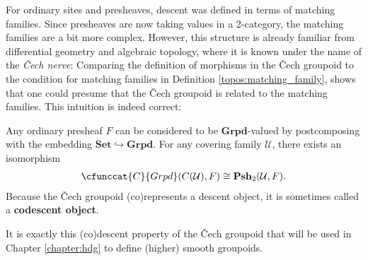     For ordinary sites and presheaves, descent was defined in terms of matching families. Since presheaves are now taking values in a 2-category, the matching families are a bit more complex. However, this structure is already familiar from differential geometry and algebraic topology, where it is known under the name of the \textit{\v{C}ech nerve}:
    Comparing the definition of morphisms in the \v{C}ech groupoid to the condition for matching families in Definition \ref{topos:matching_family}, shows that one could presume that the \v{C}ech groupoid is related to the matching families. This intuition is indeed correct:
    \begin{property}\label{topos:cech_matching_families}
        Any ordinary presheaf $F$ can be considered to be $\mathbf{Grpd}$-valued by postcomposing with the embedding $\mathbf{Set}\hookrightarrow\mathbf{Grpd}$. For any covering family $\mathcal{U}$, there exists an isomorphism
        \begin{gather}
            \cfunccat{C}{Grpd}(C(\mathcal{U}),F)\cong\mathbf{Psh}_2(\mathcal{U},F).
        \end{gather}
        Because the \v{C}ech groupoid (co)represents a descent object, it is sometimes called a \textbf{codescent object}.
    \end{property}
    It is exactly this (co)descent property of the \v{C}ech groupoid that will be used in Chapter \ref{chapter:hdg} to define (higher) smooth groupoids.

